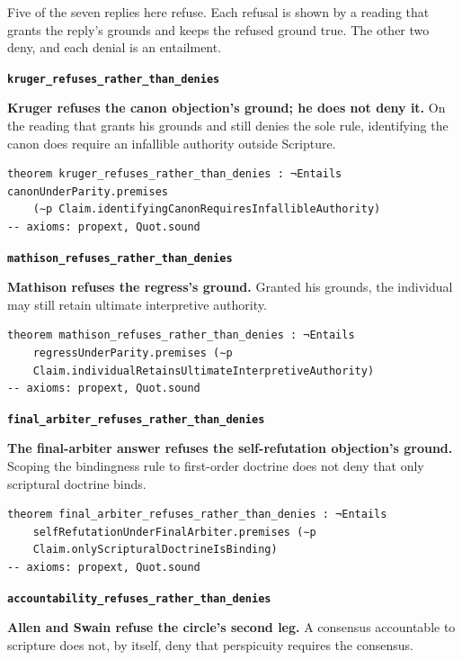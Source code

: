 \documentclass[11pt]{article}
\begin{document}
Five of the seven replies here refuse. Each refusal is shown by a reading that grants the reply’s grounds and keeps the refused ground true. The other two deny, and each denial is an entailment.

\par\medskip\noindent\textbf{\texttt{kruger\_\allowbreak{}refuses\_\allowbreak{}rather\_\allowbreak{}than\_\allowbreak{}denies}}\par\nobreak\noindent
\textbf{Kruger refuses the canon objection’s ground; he does not deny it.} On the reading that grants his grounds and still denies the sole rule, identifying the canon does require an infallible authority outside Scripture.

{\small\begin{verbatim}
theorem kruger_refuses_rather_than_denies : ¬Entails canonUnderParity.premises
    (∼p Claim.identifyingCanonRequiresInfallibleAuthority)
-- axioms: propext, Quot.sound
\end{verbatim}}
\par\medskip\noindent\textbf{\texttt{mathison\_\allowbreak{}refuses\_\allowbreak{}rather\_\allowbreak{}than\_\allowbreak{}denies}}\par\nobreak\noindent
\textbf{Mathison refuses the regress’s ground.} Granted his grounds, the individual may still retain ultimate interpretive authority.

{\small\begin{verbatim}
theorem mathison_refuses_rather_than_denies : ¬Entails
    regressUnderParity.premises (∼p
    Claim.individualRetainsUltimateInterpretiveAuthority)
-- axioms: propext, Quot.sound
\end{verbatim}}
\par\medskip\noindent\textbf{\texttt{final\_\allowbreak{}arbiter\_\allowbreak{}refuses\_\allowbreak{}rather\_\allowbreak{}than\_\allowbreak{}denies}}\par\nobreak\noindent
\textbf{The final-arbiter answer refuses the self-refutation objection’s ground.} Scoping the bindingness rule to first-order doctrine does not deny that only scriptural doctrine binds.

{\small\begin{verbatim}
theorem final_arbiter_refuses_rather_than_denies : ¬Entails
    selfRefutationUnderFinalArbiter.premises (∼p
    Claim.onlyScripturalDoctrineIsBinding)
-- axioms: propext, Quot.sound
\end{verbatim}}
\par\medskip\noindent\textbf{\texttt{accountability\_\allowbreak{}refuses\_\allowbreak{}rather\_\allowbreak{}than\_\allowbreak{}denies}}\par\nobreak\noindent
\textbf{Allen and Swain refuse the circle’s second leg.} A consensus accountable to scripture does not, by itself, deny that perspicuity requires the consensus.
\end{document}
